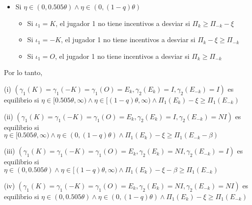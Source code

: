 {\begin{enumerate}
\begin{enumerate}
\begin{itemize}
\begin{itemize}
                \item Si $ \iota_1=-K $, el jugador 1 no tiene incentivos a desviar si $ \Pi_k - \xi - \beta \geq \Pi_{-k} $
                \item Si $ \iota_1=O  $, el jugador 1 no tiene incentivos a desviar si $ \Pi_k - \beta \geq \Pi_{-k} $
            \end{itemize}
        \item Si $\eta \in (0,0.505\theta) \wedge \eta \in (0,(1-q)\theta)$
            \begin{itemize}
                \item Si $ \iota_1=K  $, el jugador 1 no tiene incentivos a desviar si $ \Pi_k \geq \Pi_{-k} - \xi $
                \item Si $ \iota_1=-K $, el jugador 1 no tiene incentivos a desviar si $ \Pi_k - \xi \geq \Pi_{-k} $
                \item Si $ \iota_1=O  $, el jugador 1 no tiene incentivos a desviar si $ \Pi_k \geq \Pi_{-k} $
            \end{itemize}
        \end{itemize}
    
    Por lo tanto, 
    
    \noindent (i) $(\gamma_1(K)=\gamma_1(-K)=\gamma_1(O)=E_k, \gamma_2(E_k)=I, \gamma_2(E_{-k})=I)$ es equilibrio si $\eta \in [0.505\theta, \infty) \wedge \eta \in [(1-q)\theta, \infty) \wedge \Pi_1(E_{k})- \xi \geq \Pi_1(E_{-k})$ 
    
    \noindent (ii) $(\gamma_1(K)=\gamma_1(-K)=\gamma_1(O)=E_k, \gamma_2(E_k)=I, \gamma_2(E_{-k})=NI)$ es equilibrio si $\eta \in [0.505\theta, \infty) \wedge \eta \in (0, (1-q)\theta) \wedge \Pi_1(E_{k})- \xi \geq \Pi_1(E_{-k}-\beta)$ 
    
    \noindent (iii) $(\gamma_1(K)=\gamma_1(-K)=\gamma_1(O)=E_k, \gamma_2(E_k)=NI, \gamma_2(E_{-k})=I)$ es equilibrio si $\eta \in (0, 0.505\theta) \wedge \eta \in [(1-q)\theta, \infty) \wedge \Pi_1(E_{k})- \xi -\beta \geq \Pi_1(E_{-k})$ 
    
    \noindent (iv) $(\gamma_1(K)=\gamma_1(-K)=\gamma_1(O)=E_k, \gamma_2(E_k)=NI, \gamma_2(E_{-k})=NI)$ es equilibrio si $\eta\in (0, 0.505\theta) \wedge \eta \in (0, (1-q)\theta) \wedge \Pi_1(E_{k})- \xi \geq \Pi_1(E_{-k})$
    \end{enumerate}   
    

\end{enumerate}}

